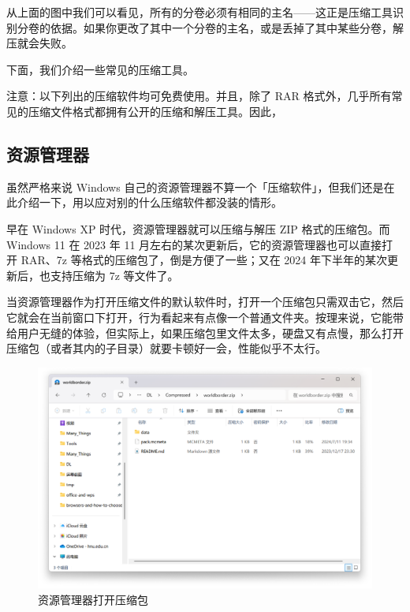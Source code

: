{\begin{note}
  从上面的图中我们可以看见，所有的分卷必须有相同的主名——这正是压缩工具识别分卷的依据。如果你更改了其中一个分卷的主名，或是丢掉了其中某些分卷，解压就会失败。
\end{note}

下面，我们介绍一些常见的压缩工具。

\begin{warning}
  注意：以下列出的压缩软件均可免费使用。并且，除了 RAR 格式外，几乎所有常见的压缩文件格式都拥有公开的压缩和解压工具。因此，
\end{warning}

\subsection{资源管理器}

虽然严格来说 Windows 自己的资源管理器不算一个「压缩软件」，但我们还是在此介绍一下，用以应对别的什么压缩软件都没装的情形。

早在 Windows XP 时代，资源管理器就可以压缩与解压 ZIP 格式的压缩包。而 Windows 11 在 2023 年 11 月左右的某次更新后，它的资源管理器也可以直接打开 RAR、7z 等格式的压缩包了，倒是方便了一些；又在 2024 年下半年的某次更新后，也支持压缩为 7z 等文件了。

当资源管理器作为打开压缩文件的默认软件时，打开一个压缩包只需双击它，然后它就会在当前窗口下打开，行为看起来有点像一个普通文件夹。按理来说，它能带给用户无缝的体验，但实际上，如果压缩包里文件太多，硬盘又有点慢，那么打开压缩包（或者其内的子目录）就要卡顿好一会，性能似乎不太行。

\begin{figure}[htb!]
  \centering
  \includegraphics[width=.65\textwidth]{assets/software/explorer-open-zip.png}
  \caption{资源管理器打开压缩包}
  \label{fig:explorer-open-zip}
\end{figure}

}
